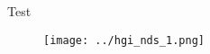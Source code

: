 \documentclass{article}
\begin{document}
Test
\begin{figure}
\centering
\texttt{[image: ../hgi\_nds\_1.png]} 
\label{fig:1}
\end{figure}
\end{document}
